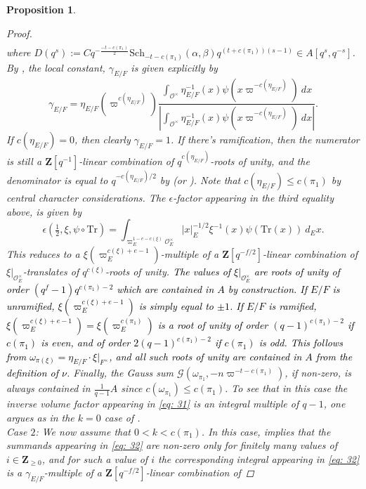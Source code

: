 \documentclass{amsart}
\theoremstyle{plain}
\newtheorem{prop}[thm]{Proposition}
\theoremstyle{plain}
\theoremstyle{remark}
\begin{document}
\begin{prop}
\begin{proof}
\begin{align*}
        \end{align*}
        where $D(q^s):=Cq^{-\tfrac{-t-c(\pi_1)}{2}}\mathrm{Sch}_{-t-c(\pi_1)}(\alpha,\beta)q^{(t+c(\pi_1))(s-1)}\in A[q^s,q^{-s}]$. By \cite{automorphic_on_GL}, the local constant, $\gamma_{E/F}$ is given explicitly by $$\gamma_{E/F}=\eta_{E/F}\left(\varpi^{c(\eta_{E/F})}\right)\frac{\int_{\mathcal{O}^\times}\eta_{E/F}^{-1}(x)\psi(x\varpi^{-c(\eta_{E/F})})\ dx}{|\int_{\mathcal{O}^\times}\eta_{E/F}^{-1}(x)\psi(x\varpi^{-c(\eta_{E/F})})\ dx|}.$$
        If $c(\eta_{E/F})=0$, then clearly $\gamma_{E/F}=1$. If
        there's ramification, then
         the numerator is still a $\mathbf{Z}[q^{-1}]$-linear combination of $q^{c(\eta_{E/F})}$-roots of unity, and the denominator is equal to $q^{-c(\eta_{E/F})/2}$ by \cite{biswas2017twisting} (or \cite{gel1969representation}). Note that $c(\eta_{E/F})\leq c(\pi_1)$ by central character considerations. 
        The $\epsilon$-factor appearing in the third equality above, is given by 
        $$\epsilon(\tfrac{1}{2},\xi,\psi\circ\mathrm{Tr})=\int_{\varpi_E^{1-e-c(\xi)}\mathcal{O}_E^\times}|x|_E^{-1/2}\xi^{-1}(x)\psi(\mathrm{Tr}(x))\ d_Ex.$$
        This reduces to a $\xi(\varpi_E^{c(\xi)+e-1})$-multiple of a $\mathbf{Z}[q^{-f/2}]$-linear combination of $\xi|_{\mathcal{O}_E^\times}$-translates of $q^{c(\xi)}$-roots of unity. \textcolor{black}{The values of $\xi|_{\mathcal{O}_E^\times}$ are roots of unity of order $(q^f-1)q^{c(\pi_1)-2}$ which are contained in $A$ by construction. If $E/F$ is unramified, $\xi(\varpi_E^{c(\xi)+e-1})$ is simply equal to $\pm 1$. If $E/F$ is ramified,  $\xi(\varpi_E^{c(\xi)+e-1})=\xi(\varpi_E^{c(\pi_1)})$ is a root of unity of order $(q-1)^{c(\pi_1)-2}$ if $c(\pi_1)$ is even, and of order $2(q-1)^{c(\pi_1)-2}$ if $c(\pi_1)$ is odd. This follows from $\omega_{\pi(\xi)}=\eta_{E/F}\cdot \xi|_{F^\times}$, and all such roots of unity are contained in $A$ from the definition of $\nu$}. Finally, the Gauss sum $\mathscr{G}(\omega_{\pi_1},-n\varpi^{-t-c(\pi_1)})$, if non-zero, is always contained in $\tfrac{1}{q-1}A$ since $c(\omega_{\pi_1})\leq c(\pi_1)$. To see that in this case the inverse volume factor appearing in \eqref{eq: 31} is an integral multiple of $q-1$, one argues as in the $k=0$ case of .\\
        \textit{Case} $2$: We now assume that $0<k<c(\pi_1)$. In this case,  implies that the summands appearing in \eqref{eq: 32} are non-zero only for finitely many values of $i\in\mathbf{Z}_{\geq 0}$, and for such a value of $i$ the corresponding integral appearing in \eqref{eq: 32} is a $\gamma_{E/F}$-multiple of a $\mathbf{Z}[q^{-f/2}]$-linear combination of 

\end{proof}
\end{prop}
\end{document}
